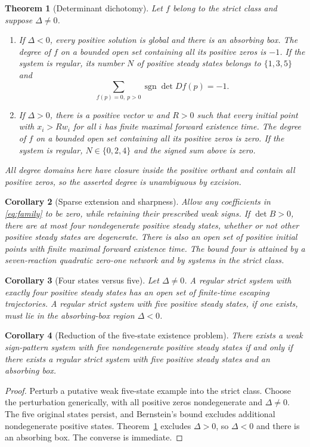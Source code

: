 \documentclass[11pt]{article}
\newtheorem{theorem}{Theorem}[section]
\newtheorem{corollary}[theorem]{Corollary}
\theoremstyle{remark}\newtheorem{remark}[theorem]{Remark}
\newcommand{\sgn}{\operatorname{sgn}}
\begin{document}
\begin{theorem}[Determinant dichotomy]\label{thm:main}
Let $f$ belong to the strict class and suppose $\Delta\ne0$.
\begin{enumerate}
\item If $\Delta<0$, every positive solution is global and there is an absorbing
box. The degree of $f$ on a bounded open set containing all its positive zeros
is $-1$. If the system is regular, its number $N$ of positive steady states
belongs to $\{1,3,5\}$ and
\[
 \sum_{f(p)=0,\ p>0}\sgn\det Df(p)=-1.
\]
\item If $\Delta>0$, there is a positive vector $w$ and $R>0$ such that every
initial point with $x_i>Rw_i$ for all $i$ has finite maximal forward existence
time. The degree of $f$ on a bounded open set containing all its positive zeros
is zero. If the system is regular, $N\in\{0,2,4\}$ and the signed sum above is zero.
\end{enumerate}
All degree domains here have closure inside the positive orthant and contain
all positive zeros, so the asserted degree is unambiguous by excision.
\end{theorem}

\begin{corollary}[Sparse extension and sharpness]\label{cor:sparse}
Allow any coefficients in \eqref{eq:family} to be zero, while retaining their
prescribed weak signs. If $\det B>0$, there are at most four nondegenerate
positive steady states, whether or not other positive steady states are
degenerate. There is also an open set of positive initial points with finite
maximal forward existence time. The bound four is attained by a seven-reaction
quadratic zero-one network and by systems in the strict class.
\end{corollary}

\begin{corollary}[Four states versus five]\label{cor:fourfive}
Let $\Delta\ne0$. A regular strict system with exactly four positive steady states has an open
set of finite-time escaping trajectories. A regular strict system with five
positive steady states, if one exists, must lie in the absorbing-box region
$\Delta<0$.
\end{corollary}

\begin{corollary}[Reduction of the five-state existence problem]\label{cor:reduction}
There exists a weak sign-pattern system with five nondegenerate positive steady
states if and only if there exists a regular strict system with five positive
steady states and an absorbing box.
\end{corollary}
\begin{proof}
Perturb a putative weak five-state example into the strict class. Choose the
perturbation generically, with all positive zeros nondegenerate and
$\Delta\ne0$. The five original states persist, and Bernstein's bound excludes
additional nondegenerate positive states. Theorem~\ref{thm:main} excludes
$\Delta>0$, so $\Delta<0$ and there is an absorbing box. The converse is immediate.
\end{proof}
\end{document}
